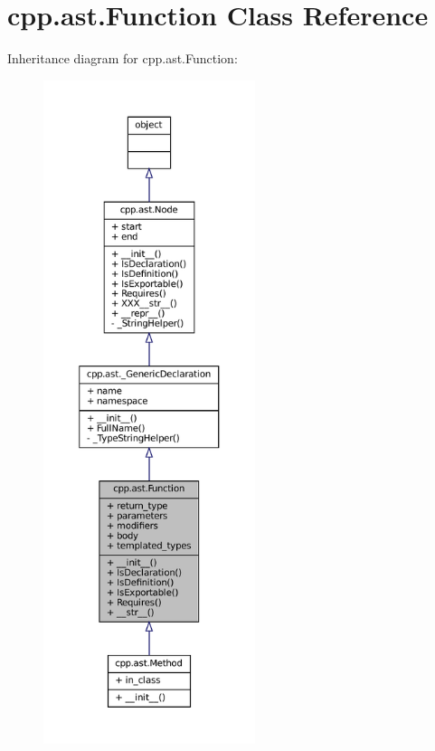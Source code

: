 \hypertarget{classcpp_1_1ast_1_1Function}{}\section{cpp.\+ast.\+Function Class Reference}
\label{classcpp_1_1ast_1_1Function}


Inheritance diagram for cpp.\+ast.\+Function\+:
\nopagebreak
\begin{figure}[H]
\begin{center}
\leavevmode
\includegraphics[height=550pt]{classcpp_1_1ast_1_1Function__inherit__graph}
\end{center}
\end{figure}


